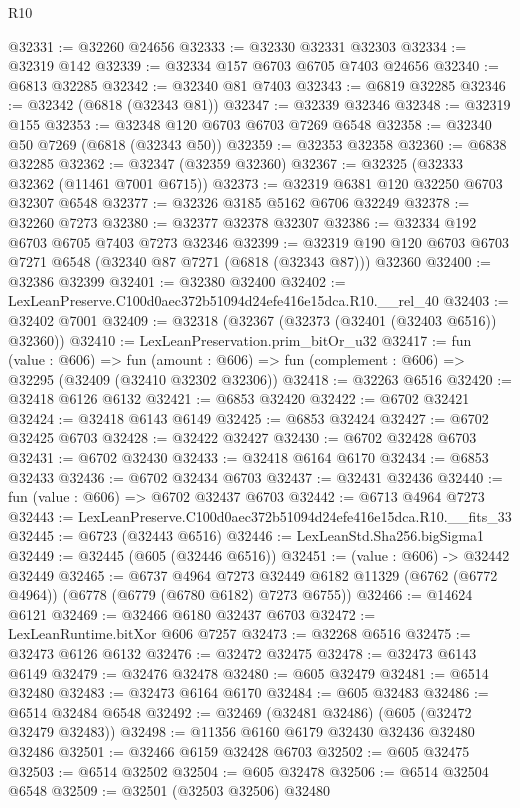 \begin{lexlean}{R10}
\begin{coremodule}
@32331 := @32260 @24656
@32333 := @32330 @32331 @32303
@32334 := @32319 @142
@32339 := @32334 @157 @6703 @6705 @7403 @24656
@32340 := @6813 @32285
@32342 := @32340 @81 @7403
@32343 := @6819 @32285
@32346 := @32342 (@6818 (@32343 @81))
@32347 := @32339 @32346
@32348 := @32319 @155
@32353 := @32348 @120 @6703 @6703 @7269 @6548
@32358 := @32340 @50 @7269 (@6818 (@32343 @50))
@32359 := @32353 @32358
@32360 := @6838 @32285
@32362 := @32347 (@32359 @32360)
@32367 := @32325 (@32333 @32362 (@11461 @7001 @6715))
@32373 := @32319 @6381 @120 @32250 @6703 @32307 @6548
@32377 := @32326 @3185 @5162 @6706 @32249
@32378 := @32260 @7273
@32380 := @32377 @32378 @32307
@32386 := @32334 @192 @6703 @6705 @7403 @7273 @32346
@32399 := @32319 @190 @120 @6703 @6703 @7271 @6548 (@32340 @87 @7271 (@6818 (@32343 @87))) @32360
@32400 := @32386 @32399
@32401 := @32380 @32400
@32402 := LexLeanPreserve.C100d0aec372b51094d24efe416e15dca.R10.__rel_40
@32403 := @32402 @7001
@32409 := @32318 (@32367 (@32373 (@32401 (@32403 @6516)) @32360))
@32410 := LexLeanPreservation.prim_bitOr_u32
@32417 := fun (value : @606) =>
  fun (amount : @606) => fun (complement : @606) => @32295 (@32409 (@32410 @32302 @32306))
@32418 := @32263 @6516
@32420 := @32418 @6126 @6132
@32421 := @6853 @32420
@32422 := @6702 @32421
@32424 := @32418 @6143 @6149
@32425 := @6853 @32424
@32427 := @6702 @32425 @6703
@32428 := @32422 @32427
@32430 := @6702 @32428 @6703
@32431 := @6702 @32430
@32433 := @32418 @6164 @6170
@32434 := @6853 @32433
@32436 := @6702 @32434 @6703
@32437 := @32431 @32436
@32440 := fun (value : @606) => @6702 @32437 @6703
@32442 := @6713 @4964 @7273
@32443 := LexLeanPreserve.C100d0aec372b51094d24efe416e15dca.R10.__fits_33
@32445 := @6723 (@32443 @6516)
@32446 := LexLeanStd.Sha256.bigSigma1
@32449 := @32445 (@605 (@32446 @6516))
@32451 := (value : @606) -> @32442 @32449
@32465 := @6737
    @4964
    @7273
    @32449
    @6182
    @11329
    (@6762 (@6772 @4964))
    (@6778 (@6779 (@6780 @6182) @7273 @6755))
@32466 := @14624 @6121
@32469 := @32466 @6180 @32437 @6703
@32472 := LexLeanRuntime.bitXor @606 @7257
@32473 := @32268 @6516
@32475 := @32473 @6126 @6132
@32476 := @32472 @32475
@32478 := @32473 @6143 @6149
@32479 := @32476 @32478
@32480 := @605 @32479
@32481 := @6514 @32480
@32483 := @32473 @6164 @6170
@32484 := @605 @32483
@32486 := @6514 @32484 @6548
@32492 := @32469 (@32481 @32486) (@605 (@32472 @32479 @32483))
@32498 := @11356 @6160 @6179 @32430 @32436 @32480 @32486
@32501 := @32466 @6159 @32428 @6703
@32502 := @605 @32475
@32503 := @6514 @32502
@32504 := @605 @32478
@32506 := @6514 @32504 @6548
@32509 := @32501 (@32503 @32506) @32480

\end{coremodule}
\end{lexlean}

